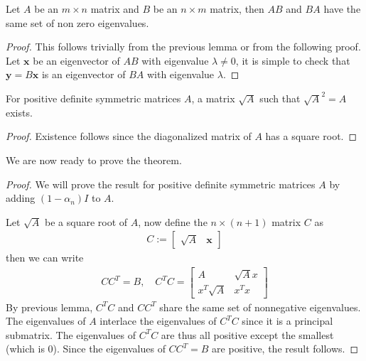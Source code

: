 \documentclass{math}
\renewcommand{\vec}[1]{\boldsymbol{#1}}
\begin{document}
\begin{lemma}
    Let $A$ be an $m \times n$ matrix and $B$ be an $n \times m$ matrix, then $AB$ and $BA$ have the same set of non zero eigenvalues.
\end{lemma}
\begin{proof}
    This follows trivially from the previous lemma or from the following proof.
    Let $\vec{x}$ be an eigenvector of $AB$ with eigenvalue $\lambda \neq 0$, it is simple to check that $\vec{y} = B\vec{x}$ is an eigenvector of $BA$ with eigenvalue $\lambda$.
\end{proof}

\begin{lemma}
    For positive definite symmetric matrices $A$, a matrix $\sqrt{A}$ such that $\sqrt{A}^2 = A$ exists.
\end{lemma}
\begin{proof}
    Existence follows since the diagonalized matrix of $A$ has a square root.
\end{proof}

We are now ready to prove the theorem.

\begin{proof}
    We will prove the result for positive definite symmetric matrices $A$ by adding $(1 - \alpha_n) I$ to $A$.

    Let $\sqrt{A}$ be a square root of $A$, now define the $n \times (n + 1)$ matrix $C$ as
    \begin{align*}
        C := \begin{bmatrix}
                 \sqrt{A} & \vec{x}
             \end{bmatrix}
    \end{align*}
    then we can write
    \begin{align*}
        CC^T = B, \quad C^T C = \begin{bmatrix}
                                    A            & \sqrt{A}x \\
                                    x^T \sqrt{A} & x^T x
                                \end{bmatrix}
    \end{align*}
    By previous lemma, $C^TC$ and $CC^T$ share the same set of nonnegative eigenvalues. The eigenvalues of $A$ interlace the eigenvalues of $C^T C$ since it is a principal submatrix.
    The eigenvalues of $C^TC$ are thus all positive except the smallest (which is $0$). Since the eigenvalues of $CC^T = B$ are positive, the result follows.
\end{proof}
\end{document}
